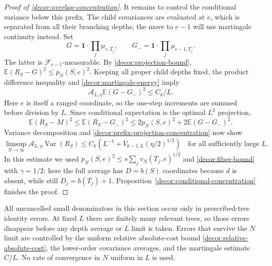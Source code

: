 \begin{proof}[Proof of \cref{decor:overlap-concentration}]
It remains to control the conditional variance below this prefix.
The child covariances are evaluated at $e$, which is separated from
all their branching depths; the move to $e-1$ will use martingale
continuity instead. Set
\[
 G=\mathbf1\cdot\prod_j \mu_{e,T_j},
 \qquad G_-=\mathbf1\cdot\prod_j \mu_{e-1,T_j}.
\]
The latter is $\mathscr F_{e-1}$-measurable.  By
\eqref{decor:projection-bound},
$\mathbb E(R_S-G)^2\le p_N(S,e)^2$.
Keeping all proper child depths fixed, the product difference
inequality and \eqref{decor:martingale-energy} imply
\begin{equation}
 \mathcal A_{L,\eta}\mathbb E(G-G_-)^2\le C_k/L.
 \label{decor:adjacent-prefix-error}
\end{equation}
Here $e$ is itself a ranged coordinate, so the one-step increments
are summed before division by $L$.  Since conditional expectation
is the optimal $L^2$ projection,
\[
 \mathbb E(R_S-M)^2
   \le\mathbb E(R_S-G_-)^2
   \le2p_N(S,e)^2+2\mathbb E(G-G_-)^2.
\]
Variance decomposition and
\eqref{decor:prefix-projection-concentration} now show
\begin{equation}
 \limsup_{N\to\infty}
      \mathcal A_{L,\eta}\operatorname{Var}(R_S)
 \le C_k\left(L^{-1}+V_{k-1,L}(\eta/2)^{1/2}\right)
 \quad\text{for all sufficiently large }L.
 \label{decor:variance-estimate}
\end{equation}
In this estimate we used
$p_N(S,e)^2\le s\sum_jv_N(T_j,e)^{1/2}$ and
\eqref{decor:fiber-bound} with $\gamma=1/2$: here the full average has
$D=b(S)$ coordinates because $d$ is absent, while still
$D_j=b(T_j)+1$. Proposition~\ref{decor:conditional-concentration}
finishes the proof.
\end{proof}

\begin{remark}
\label{decor:order-of-limits}
All uncancelled small denominators in this section occur only in prescribed-tree
identity errors.  At fixed $L$ there are finitely many relevant trees,
so those errors disappear before any depth average or $L$ limit is
taken.  Errors that survive the $N$ limit are controlled by the
uniform relative absolute-cost bound
\eqref{decor:relative-absolute-cost}, the lower-order covariance
averages, and the martingale estimate $C/L$.  No rate of convergence
in $N$ uniform in $L$ is used.
\end{remark}
